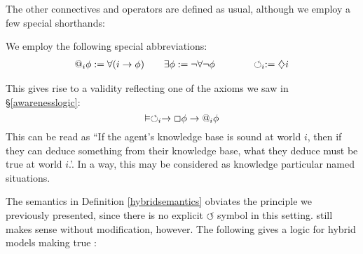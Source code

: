 The other connectives and operators are defined as usual, although we employ a
few special shorthands:

\begin{definition}
  We employ the following special abbreviations:
  \begin{eqnarray}
    \text{{\upshape{@}}}_i \phi := \forall (i \rightarrow \phi)
    \hspace{2em} & \exists \phi := \neg \forall \neg \phi \hspace{3em} &
    \circlearrowleft_i := \diamondsuit i \nonumber
  \end{eqnarray}
\end{definition}

This gives rise to a validity reflecting one of the axioms we saw in
{\S}\ref{awarenesslogic}:
\[ \vDash \circlearrowleft_i \rightarrow \Box \phi \rightarrow
   \text{{\upshape{@}}}_i \phi \]
This can be read as ``If the agent's knowledge base is sound at world $i$,
then if they can deduce something from their knowledge base, what they deduce
must be true at world $i$.'.  In a way, this may be considered as
{} knowledge particular named situations.



The semantics in Definition \ref{hybridsemantics} obviates the 
principle we previously presented, since there is no explicit
$\circlearrowleft$ symbol in this setting.  still makes sense
without modification, however.  The following gives a logic for hybrid models
making true :

